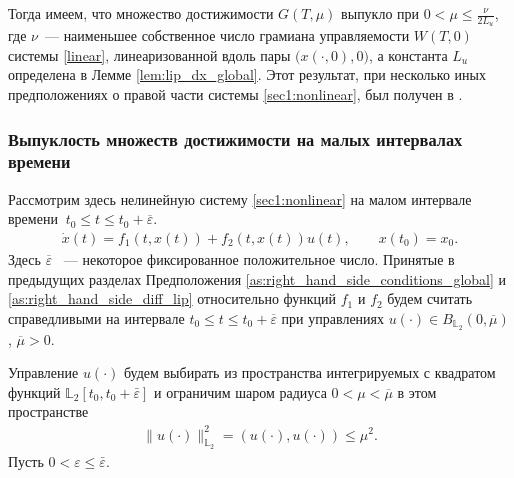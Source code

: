 \documentclass[../main.tex]{subfiles}
\begin{document}
	Тогда имеем, что множество достижимости $G(T,\mu)$ выпукло при $ 0 < \mu \leqslant \frac{\nu}{2L_u} $, где $\nu$~--- наименьшее собственное число грамиана управляемости $W(T, 0)$ системы  \eqref{linear}, линеаризованной вдоль пары $\big(x(\cdot, 0), 0 \big)$, а константа $L_u $ определена в Лемме  \ref{lem:lip_dx_global}. Этот результат, при несколько иных предположениях о правой части системы \eqref{sec1:nonlinear}, был получен в \cite{Polyak2004}.
	
    \subsubsection{Выпуклость множеств достижимости на малых интервалах времени}
    Рассмотрим здесь нелинейную систему \eqref{sec1:nonlinear} на малом интервале времени $\ t_0 \leqslant t \leqslant t_0 + \overline{\varepsilon} $.
    \begin{gather}\label{nonlinearT}
			\dot{x}(t)=f_1(t,x(t))+f_2(t,x(t))u(t), \qquad x(t_0) = x_0.
	\end{gather}
    Здесь $ \overline{\varepsilon} $ ~--- некоторое фиксированное положительное число. Принятые в предыдущих разделах Предположения \ref{as:right_hand_side_conditions_global} и \ref{as:right_hand_side_diff_lip} относительно функций $f_1$ и $f_2$ будем считать справедливыми на интервале $t_0 \leqslant t \leqslant t_0 + \overline{\varepsilon} $ при управлениях $u(\cdot) \in B_{\mathbb{L}_2}(0, \overline{\mu}) $, $\overline{\mu} > 0$.
   

     Управление $u(\cdot)$ будем выбирать из
    пространства интегрируемых с квадратом функций $\mathbb{L}_2[t_0,t_0+\bar{\varepsilon}]$ и ограничим шаром радиуса $  0 < \mu < \overline{\mu} $ в этом пространстве
    \begin{gather*}
    	\lVert u(\cdot)\rVert^2_{\mathbb{L}_2} = \left(u(\cdot),u(\cdot) \right) \leqslant \mu^2.
    \end{gather*}
	Пусть $ 0 <  \varepsilon \leqslant \bar{\varepsilon} $.  
	
\end{document}
